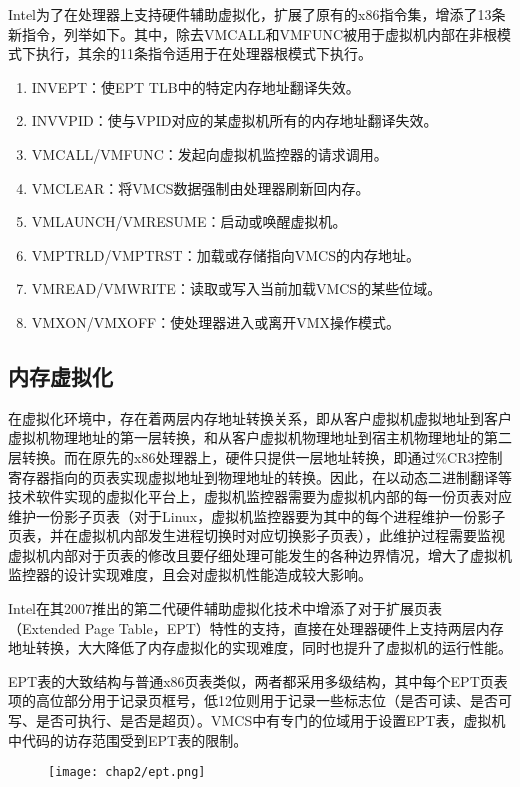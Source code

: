Intel为了在处理器上支持硬件辅助虚拟化，扩展了原有的x86指令集，增添了13条新指令，列举如下。其中，除去VMCALL和VMFUNC被用于虚拟机内部在非根模式下执行，其余的11条指令适用于在处理器根模式下执行。

\begin{enumerate}
\item INVEPT：使EPT TLB中的特定内存地址翻译失效。
\item INVVPID：使与VPID对应的某虚拟机所有的内存地址翻译失效。
\item VMCALL/VMFUNC：发起向虚拟机监控器的请求调用。
\item VMCLEAR：将VMCS数据强制由处理器刷新回内存。
\item VMLAUNCH/VMRESUME：启动或唤醒虚拟机。
\item VMPTRLD/VMPTRST：加载或存储指向VMCS的内存地址。
\item VMREAD/VMWRITE：读取或写入当前加载VMCS的某些位域。
\item VMXON/VMXOFF：使处理器进入或离开VMX操作模式。
\end{enumerate}

\subsection{内存虚拟化}

在虚拟化环境中，存在着两层内存地址转换关系，即从客户虚拟机虚拟地址到客户虚拟机物理地址的第一层转换，和从客户虚拟机物理地址到宿主机物理地址的第二层转换。而在原先的x86处理器上，硬件只提供一层地址转换，即通过\%CR3控制寄存器指向的页表实现虚拟地址到物理地址的转换。因此，在以动态二进制翻译等技术软件实现的虚拟化平台上，虚拟机监控器需要为虚拟机内部的每一份页表对应维护一份影子页表（对于Linux，虚拟机监控器要为其中的每个进程维护一份影子页表，并在虚拟机内部发生进程切换时对应切换影子页表），此维护过程需要监视虚拟机内部对于页表的修改且要仔细处理可能发生的各种边界情况，增大了虚拟机监控器的设计实现难度，且会对虚拟机性能造成较大影响。

Intel在其2007推出的第二代硬件辅助虚拟化技术中增添了对于扩展页表（Extended Page Table，EPT）特性的支持\cite{adams2006comparison}，直接在处理器硬件上支持两层内存地址转换，大大降低了内存虚拟化的实现难度，同时也提升了虚拟机的运行性能。

EPT表的大致结构与普通x86页表类似，两者都采用多级结构，其中每个EPT页表项的高位部分用于记录页框号，低12位则用于记录一些标志位（是否可读、是否可写、是否可执行、是否是超页）。VMCS中有专门的位域用于设置EPT表，虚拟机中代码的访存范围受到EPT表的限制。

\begin{figure}[!htbp]
  \centering
  \texttt{[image: chap2/ept.png]}
\end{figure}

